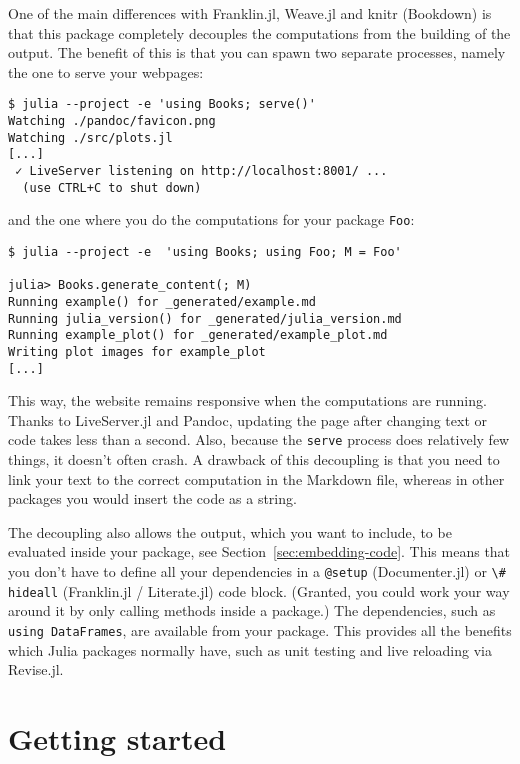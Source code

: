 \documentclass[
  14pt
  american,
  paper=a4,
  ,captions=tableheading
]{scrreprt}
\newcommand{\passthrough}[1]{#1}
\begin{document}
One of the main differences with Franklin.jl, Weave.jl and knitr
(Bookdown) is that this package completely decouples the computations
from the building of the output. The benefit of this is that you can
spawn two separate processes, namely the one to serve your webpages:

\begin{lstlisting}
$ julia --project -e 'using Books; serve()'
Watching ./pandoc/favicon.png
Watching ./src/plots.jl
[...]
 ✓ LiveServer listening on http://localhost:8001/ ...
  (use CTRL+C to shut down)
\end{lstlisting}

and the one where you do the computations for your package
\passthrough{\lstinline!Foo!}:

\begin{lstlisting}
$ julia --project -e  'using Books; using Foo; M = Foo'

julia> Books.generate_content(; M)
Running example() for _generated/example.md
Running julia_version() for _generated/julia_version.md
Running example_plot() for _generated/example_plot.md
Writing plot images for example_plot
[...]
\end{lstlisting}

This way, the website remains responsive when the computations are
running. Thanks to LiveServer.jl and Pandoc, updating the page after
changing text or code takes less than a second. Also, because the
\passthrough{\lstinline!serve!} process does relatively few things, it
doesn't often crash. A drawback of this decoupling is that you need to
link your text to the correct computation in the Markdown file, whereas
in other packages you would insert the code as a string.

The decoupling also allows the output, which you want to include, to be
evaluated inside your package, see Section~\ref{sec:embedding-code}.
This means that you don't have to define all your dependencies in a
\passthrough{\lstinline!@setup!} (Documenter.jl) or
\passthrough{\lstinline!\# hideall!} (Franklin.jl / Literate.jl) code
block. (Granted, you could work your way around it by only calling
methods inside a package.) The dependencies, such as
\passthrough{\lstinline!using DataFrames!}, are available from your
package. This provides all the benefits which Julia packages normally
have, such as unit testing and live reloading via Revise.jl.

\hypertarget{sec:getting-started}{%
\chapter{Getting started}\label{sec:getting-started}}
\end{document}
